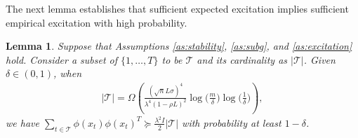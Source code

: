 \documentclass[letterpaper,10pt,conference]{ieeeconf}
\theoremstyle{plain} %
\newtheorem{lemma}{Lemma}
\theoremstyle{plain} %
\theoremstyle{plain} %
\theoremstyle{plain}
\begin{document}
The next lemma establishes that sufficient expected excitation implies sufficient empirical excitation with high probability. 
\begin{lemma}\label{xxlowerbound}
    Suppose that Assumptions \ref{as:stability}, \ref{as:subg}, and  \ref{as:excitation} hold.  Consider a subset of $\{1,\dots, T\}$  to be $\mathcal{T}$ and its cardinality as $|\mathcal{T}|$. Given $\delta\in(0,1)$, when 
\begin{align}\label{finaltimebound}
   |\mathcal{T}| = \Omega\left( \frac{ (\sqrt{n}L \sigma)^4}{\lambda^4 (1 - \rho L)^2}  \log\Bigr(\frac{m}{\delta}\Bigr)\log\Bigr(\frac{1}{\delta}\Bigr)\right),
\end{align}
we have $\sum_{t\in \mathcal{T}} \phi(x_t)\phi(x_t)^T \succeq \frac{\lambda^2 I}{2}|\mathcal{T}|$ with probability at least $1-\delta$.
\end{lemma}
\end{document}
